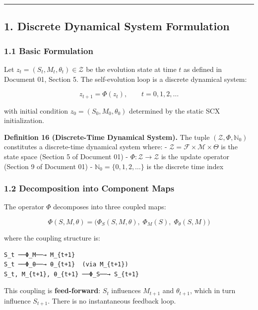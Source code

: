 \documentclass[
  12pt,
]{article}
\begin{document}
\begin{center}\rule{0.5\linewidth}{0.5pt}\end{center}

\subsection{1. Discrete Dynamical System
Formulation}\label{discrete-dynamical-system-formulation}

\subsubsection{1.1 Basic Formulation}\label{basic-formulation}

Let \(z_t = (S_t, M_t, \theta_t) \in \mathcal{Z}\) be the evolution
state at time \(t\) as defined in Document 01, Section 5. The
self-evolution loop is a discrete dynamical system:

\[z_{t+1} = \Phi(z_t), \qquad t = 0, 1, 2, \dots\]

with initial condition \(z_0 = (S_0, M_0, \theta_0)\) determined by the
static SCX initialization.

\textbf{Definition 16 (Discrete-Time Dynamical System).} The tuple
\((\mathcal{Z}, \Phi, \mathbb{N}_0)\) constitutes a discrete-time
dynamical system where: -
\(\mathcal{Z} = \mathcal{F} \times \mathcal{M} \times \Theta\) is the
state space (Section 5 of Document 01) -
\(\Phi: \mathcal{Z} \to \mathcal{Z}\) is the update operator (Section 9
of Document 01) - \(\mathbb{N}_0 = \{0, 1, 2, \dots\}\) is the discrete
time index

\subsubsection{1.2 Decomposition into Component
Maps}\label{decomposition-into-component-maps}

The operator \(\Phi\) decomposes into three coupled maps:

\[\Phi(S, M, \theta) = \bigl( \Phi_S(S, M, \theta),\; \Phi_M(S),\; \Phi_\theta(S, M) \bigr)\]

where the coupling structure is:

\begin{verbatim}
S_t ──Φ_M──→ M_{t+1}
S_t ──Φ_θ──→ θ_{t+1}  (via M_{t+1})
S_t, M_{t+1}, θ_{t+1} ──Φ_S──→ S_{t+1}
\end{verbatim}

This coupling is \textbf{feed-forward}: \(S_t\) influences \(M_{t+1}\)
and \(\theta_{t+1}\), which in turn influence \(S_{t+1}\). There is no
instantaneous feedback loop.
\end{document}

